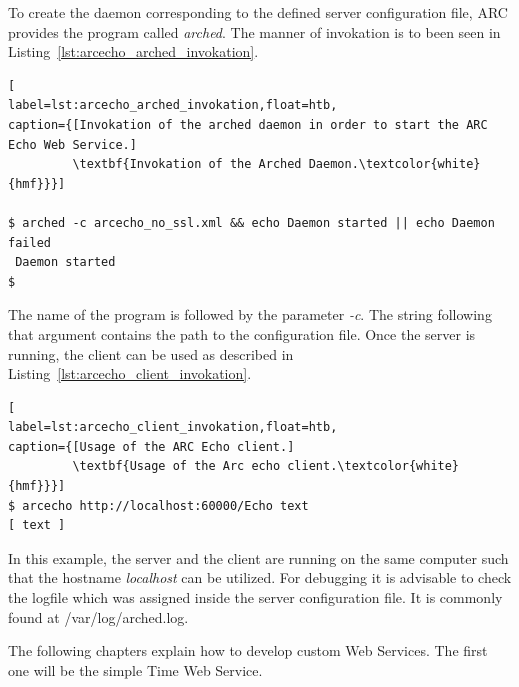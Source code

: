 To create the daemon corresponding to the defined server configuration file, ARC provides the program called \textit{arched}.
The manner of invokation is to been seen in Listing~\ref{lst:arcecho_arched_invokation}.
\begin{lstlisting}[
label=lst:arcecho_arched_invokation,float=htb,
caption={[Invokation of the arched daemon in order to start the ARC Echo Web Service.]
         \textbf{Invokation of the Arched Daemon.\textcolor{white}{hmf}}}]

$ arched -c arcecho_no_ssl.xml && echo Daemon started || echo Daemon failed
 Daemon started
$
\end{lstlisting}

%
%
The name of the program is followed by the parameter \textit{-c}.
The string following that argument contains the path to the configuration file.
Once the server is running, the client can be used as described in Listing~\ref{lst:arcecho_client_invokation}.
\begin{lstlisting}[
label=lst:arcecho_client_invokation,float=htb,
caption={[Usage of the ARC Echo client.]
         \textbf{Usage of the Arc echo client.\textcolor{white}{hmf}}}]
$ arcecho http://localhost:60000/Echo text
[ text ]
\end{lstlisting}

In this example, the server and the client are running on the same computer such that the hostname \textit{localhost} can be utilized. 
For debugging it is advisable to check the logfile which was assigned inside the server configuration file.
It is commonly found at /var/log/arched.log.

The following chapters explain how to develop custom Web Services.
The first one will be the simple Time Web Service.













